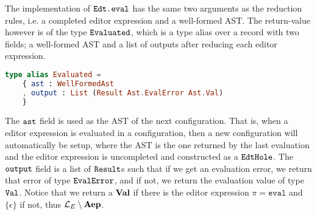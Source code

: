The implementation of $\texttt{Edt.eval}$ has the same two arguments as the
reduction rules, i.e. a completed editor expression and a well-formed AST. The
return-value however is of the type $\texttt{Evaluated}$, which is a type alias
over a record with two fields; a well-formed AST and a list of outputs after
reducing each editor expression.
\begin{lstlisting}[language=elm,%
                     label="eval-evaluated",%
                     gobble=0,%
                     ]
type alias Evaluated =
    { ast : WellFormedAst
    , output : List (Result Ast.EvalError Ast.Val)
    }
\end{lstlisting}
The $\texttt{ast}$ field is used as the AST of the next configuration. That is,
when a editor expression is evaluated in a configuration, then a new
configuration will automatically be setup, where the AST is the one returned by
the last evaluation and the editor expression is uncompleted and constructed as
a $\texttt{EdtHole}$. The $\texttt{output}$ field is a list of $\texttt{Result}$s such
that if we get an evaluation error, we return that error of type
$\texttt{EvalError}$, and if not, we return the evaluation value of type
$\texttt{Val}$\elmcore. Notice that we return a $\textbf{Val}$ if there is the editor
expression $\pi = \texttt{eval}$ and $\{\epsilon\}$ if not, thus
$\mathcal{L}_E\setminus\textbf{Aep}$.

